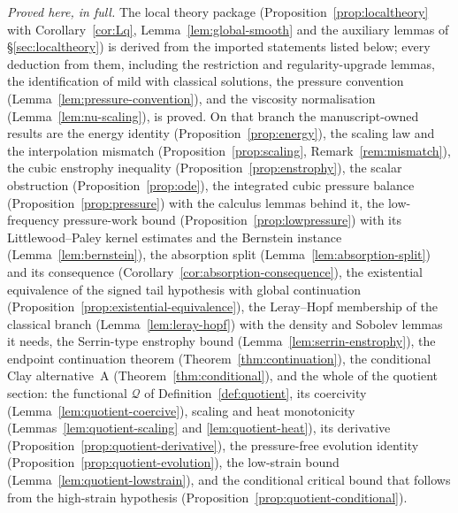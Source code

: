 \documentclass[11pt]{article}
\theoremstyle{definition}
\theoremstyle{plain}
\begin{document}
\emph{Proved here, in full.}  The local theory package
(Proposition~\ref{prop:localtheory} with Corollary~\ref{cor:Lq},
Lemma~\ref{lem:global-smooth} and the auxiliary lemmas of
\S\ref{sec:localtheory}) is derived from the imported statements listed
below; every deduction from them, including the restriction and
regularity-upgrade lemmas, the identification of mild with classical
solutions, the pressure convention (Lemma~\ref{lem:pressure-convention}),
and the viscosity normalisation (Lemma~\ref{lem:nu-scaling}), is proved.
On that branch the manuscript-owned results are the energy identity
(Proposition~\ref{prop:energy}), the scaling law and the interpolation
mismatch (Proposition~\ref{prop:scaling}, Remark~\ref{rem:mismatch}), the
cubic enstrophy inequality (Proposition~\ref{prop:enstrophy}), the scalar
obstruction (Proposition~\ref{prop:ode}), the integrated cubic pressure
balance (Proposition~\ref{prop:pressure}) with the calculus lemmas behind
it, the low-frequency pressure-work bound
(Proposition~\ref{prop:lowpressure}) with its Littlewood--Paley kernel
estimates and the Bernstein instance (Lemma~\ref{lem:bernstein}), the
absorption split (Lemma~\ref{lem:absorption-split}) and its consequence
(Corollary~\ref{cor:absorption-consequence}), the existential equivalence
of the signed tail hypothesis with global continuation
(Proposition~\ref{prop:existential-equivalence}), the Leray--Hopf
membership of the classical branch (Lemma~\ref{lem:leray-hopf}) with the
density and Sobolev lemmas it needs, the Serrin-type enstrophy bound
(Lemma~\ref{lem:serrin-enstrophy}), the endpoint continuation theorem
(Theorem~\ref{thm:continuation}), the conditional Clay alternative~A
(Theorem~\ref{thm:conditional}), and the whole of the quotient section:
the functional $\mathcal Q$ of Definition~\ref{def:quotient}, its
coercivity (Lemma~\ref{lem:quotient-coercive}), scaling and heat
monotonicity (Lemmas~\ref{lem:quotient-scaling} and
\ref{lem:quotient-heat}), its derivative
(Proposition~\ref{prop:quotient-derivative}), the pressure-free evolution
identity (Proposition~\ref{prop:quotient-evolution}), the low-strain bound
(Lemma~\ref{lem:quotient-lowstrain}), and the conditional critical bound
that follows from the high-strain hypothesis
(Proposition~\ref{prop:quotient-conditional}).
\end{document}
